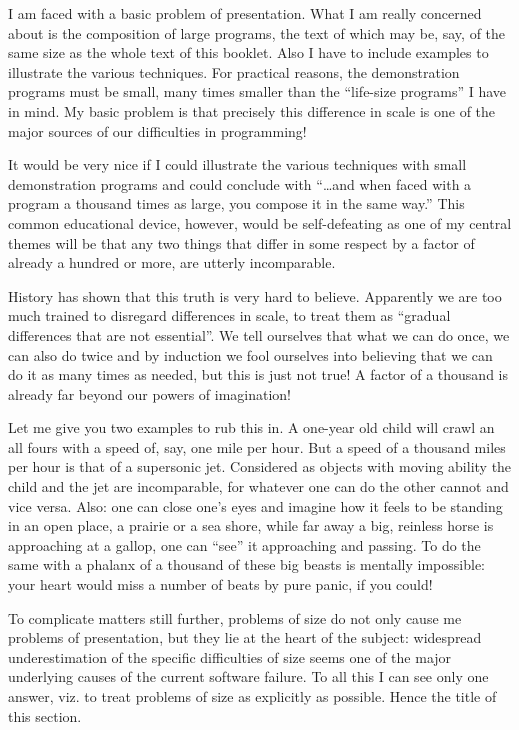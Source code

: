 I am faced with a basic problem of presentation. What I am really concerned about is the composition of large programs, the text of which may be, say, of the same size as the whole text of this booklet. Also I have to include examples to illustrate the various techniques. For practical reasons, the demonstration programs must be small, many times smaller than the ``life-size programs'' I have in mind. My basic problem is that precisely this difference in scale is one of the major sources of our difficulties in programming!

It would be very nice if I could illustrate the various techniques with small demonstration programs and could conclude with ``\dots and when faced with a program a thousand times as large, you compose it in the same way.'' This common educational device, however, would be self-defeating as one of my central themes will be that any two things that differ in some respect by a factor of already a hundred or more, are utterly incomparable.

History has shown that this truth is very hard to believe. Apparently we are too much trained to disregard differences in scale, to treat them as ``gradual differences that are not essential''. We tell ourselves that what we can do once, we can also do twice and by induction we fool ourselves into believing that we can do it as many times as needed, but this is just not true! A factor of a thousand is already far beyond our powers of imagination!

Let me give you two examples to rub this in. A one-year old child will crawl an all fours with a speed of, say, one mile per hour. But a speed of a thousand miles per hour is that of a supersonic jet. Considered as objects with moving ability the child and the jet are incomparable, for whatever one can do the other cannot and vice versa. Also: one can close one's eyes and imagine how it feels to be standing in an open place, a prairie or a sea shore, while far away a big, reinless horse is approaching at a gallop, one can ``see'' it approaching and passing. To do the same with a phalanx of a thousand of these big beasts is mentally impossible: your heart would miss a number of beats by pure panic, if you could!

To complicate matters still further, problems of size do not only cause me problems of presentation, but they lie at the heart of the subject: widespread underestimation of the specific difficulties of size seems one of the major underlying causes of the current software failure. To all this I can see only one answer, viz. to treat problems of size as explicitly as possible. Hence the title of this section.

